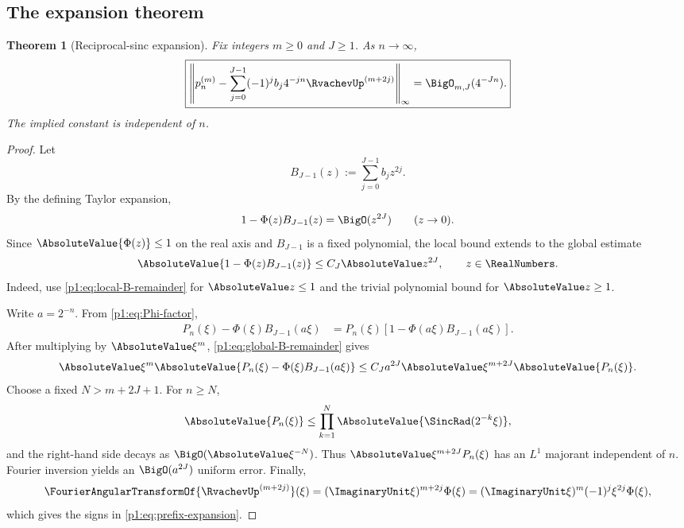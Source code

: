 \documentclass[11pt]{article}
\numberwithin{equation}{section}
\newtheorem{theorem}{Theorem}[section]
\theoremstyle{definition}
\theoremstyle{remark}
\begin{document}
\subsection{The expansion theorem}

\begin{theorem}[Reciprocal-sinc expansion]
\label{p1:thm:prefix-expansion}
Fix integers $m\ge0$ and $J\ge1$.  As $n\to\infty$,
\begin{equation}
 \boxed{
 \left\|
 p_n^{(m)}-
 \sum_{j=0}^{J-1}(-1)^jb_j4^{-jn}\RvachevUp^{(m+2j)}
 \right\|_\infty
 =\BigO_{m,J}(4^{-Jn}).}
 \label{p1:eq:prefix-expansion}
\end{equation}
The implied constant is independent of $n$.
\end{theorem}

\begin{proof}
Let
\[
 B_{J-1}(z):=\sum_{j=0}^{J-1}b_jz^{2j}.
\]
By the defining Taylor expansion,
\begin{equation}
 1-\Phi(z)B_{J-1}(z)=\BigO(z^{2J})
 \qquad(z\to0).
 \label{p1:eq:local-B-remainder}
\end{equation}
Since $\AbsoluteValue{\Phi(z)}\le1$ on the real axis and $B_{J-1}$ is a fixed polynomial, the local bound extends to the global estimate
\begin{equation}
 \AbsoluteValue{1-\Phi(z)B_{J-1}(z)}\le C_J\AbsoluteValue z^{2J},
 \qquad z\in\RealNumbers.
 \label{p1:eq:global-B-remainder}
\end{equation}
Indeed, use \eqref{p1:eq:local-B-remainder} for $\AbsoluteValue z\le1$ and the trivial polynomial bound for $\AbsoluteValue z\ge1$.

Write $a=2^{-n}$.  From \eqref{p1:eq:Phi-factor},
\begin{align}
 P_n(\xi)-\Phi(\xi)B_{J-1}(a\xi)
 &=P_n(\xi)\left[1-\Phi(a\xi)B_{J-1}(a\xi)\right].
 \label{p1:eq:Fourier-expansion-remainder}
\end{align}
After multiplying by $\AbsoluteValue\xi^m$, \eqref{p1:eq:global-B-remainder} gives
\begin{equation}
 \AbsoluteValue\xi^m
 \AbsoluteValue{P_n(\xi)-\Phi(\xi)B_{J-1}(a\xi)}
 \le C_Ja^{2J}\AbsoluteValue\xi^{m+2J}\AbsoluteValue{P_n(\xi)}.
 \label{p1:eq:Fourier-majorant}
\end{equation}
Choose a fixed $N>m+2J+1$.  For $n\ge N$,
\[
 \AbsoluteValue{P_n(\xi)}\le\prod_{k=1}^{N}\AbsoluteValue{\SincRad(2^{-k}\xi)},
\]
and the right-hand side decays as $\BigO(\AbsoluteValue\xi^{-N})$.  Thus
\(\AbsoluteValue\xi^{m+2J}P_n(\xi)\) has an $L^1$ majorant independent of $n$.  Fourier inversion yields an $\BigO(a^{2J})$ uniform error.  Finally,
\[
 \FourierAngularTransformOf{\RvachevUp^{(m+2j)}}(\xi)
 =(\ImaginaryUnit\xi)^{m+2j}\Phi(\xi)
 =(\ImaginaryUnit\xi)^m(-1)^j\xi^{2j}\Phi(\xi),
\]
which gives the signs in \eqref{p1:eq:prefix-expansion}.
\end{proof}
\end{document}
